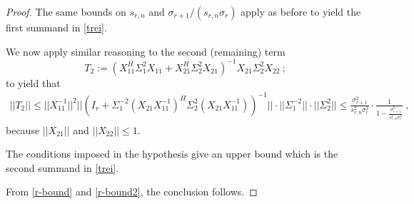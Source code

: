 \documentclass{article}
\theoremstyle{definition}
\newcommand{\smin}{s_{r,n}}
\begin{document}
\begin{proof}
The same bounds on $\smin$ and $\sigma_{r+1}/(\smin \sigma_{r})$ apply as before to yield the first summand in \eqref{trei}.

We now apply similar reasoning to the second (remaining) term
\[
T_2:= \left (X_{11}^{H} \Sigma_1^2 X_{11} + X_{21}^H \Sigma^2_2 X_{21} \right )^{-1} X_{21} \Sigma_2^2 X_{22}~;
\]
to yield that 
\begin{eqnarray} \label{r-bound2}
||T_2|| \leq ||X_{11}^{-1}||^2 ||\left ( I_r + \Sigma_1^{-2} (X_{21} X_{11}^{-1})^{H} \Sigma_2^2 (X_{21} X_{11}^{-1})\right)^{-1} || \cdot 
||\Sigma_1^{-2} || \cdot || \Sigma_2^{2}|| \leq \frac{\sigma_{r+1}^2}{\smin^2 \sigma_r^2} \cdot \frac{1}{1 - \frac{\sigma_{r+1}^2}{ \smin^2 \sigma_r^2}}~,
\end{eqnarray}
because $||X_{21}||$ and $||X_{22}|| \leq 1$.

The conditions imposed in the hypothesis give an upper bound which is the second summand in \eqref{trei}. 

From \eqref{r-bound} and \eqref{r-bound2}, the conclusion follows. 
\end{proof}
     
\end{document}
